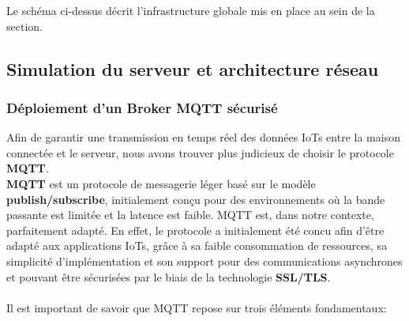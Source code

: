 \documentclass[10pt, a4paper]{report}
\begin{document}
	Le schéma ci-dessus décrit l'infrastructure globale mis en place au sein de la section.
	
	
 
	\subsection{Simulation du serveur et architecture réseau}
	\subsubsection{Déploiement d'un Broker MQTT sécurisé}
	
	Afin de garantir une transmission en temps réel des données IoTs entre la maison connectée et le serveur, nous avons trouver plus judicieux de choisir le protocole \textbf{MQTT}.\\
	\textbf{MQTT} est un protocole de messagerie léger basé sur le modèle \textbf{publish/subscribe}, initialement conçu pour des environnements où la bande passante est limitée et la latence est faible. MQTT est, dans notre contexte, parfaitement adapté. En effet, le protocole a initialement été concu afin d'être adapté aux applications IoTs, grâce à sa faible consommation de ressources, sa simplicité d'implémentation et son support pour des communications asynchrones et pouvant être sécurisées par le biais de la technologie \textbf{SSL/TLS}.\\\\
	Il est important de savoir que MQTT repose sur trois éléments fondamentaux:
\end{document}
